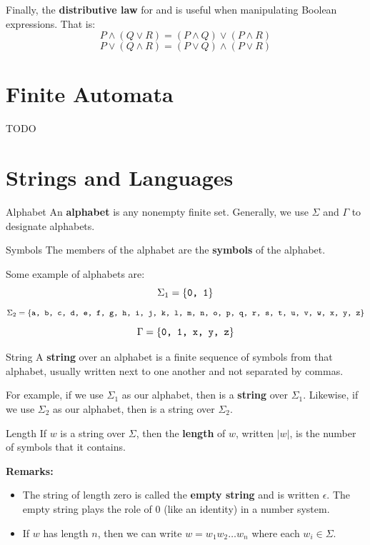 \documentclass[letterpaper]{article}
\begin{document}
Finally, the \textbf{distributive law} for  and  is useful when manipulating Boolean expressions. That is: 
\[P \land (Q \lor R) = (P \land Q) \lor (P \land R)\]
\[P \lor (Q \land R) = (P \lor Q) \land (P \lor R)\]




\newpage 
\section{Finite Automata}
TODO 





\newpage 
\section{Strings and Languages}
\begin{definition}{Alphabet}{}
    An \textbf{alphabet} is any nonempty finite set. Generally, we use $\Sigma$ and $\Gamma$ to designate alphabets.
\end{definition}

\begin{definition}{Symbols}{}
    The members of the alphabet are the \textbf{symbols} of the alphabet.
\end{definition}

Some example of alphabets are: 
\[\Sigma_1 = \{\texttt{0, 1}\}\]
\[\Sigma_2 = \{\texttt{a, b, c, d, e, f, g, h, i, j, k, l, m, n, o, p, q, r, s, t, u, v, w, x, y, z}\}\]
\[\Gamma = \{\texttt{0, 1, x, y, z}\}\]

\begin{definition}{String}{}
    A \textbf{string} over an alphabet is a finite sequence of symbols from that alphabet, usually written next to one another and not separated by commas. 
\end{definition}
For example, if we use $\Sigma_1$ as our alphabet, then  is a \textbf{string} over $\Sigma_1$. Likewise, if we use $\Sigma_2$ as our alphabet, then  is a string over $\Sigma_2$. 

\begin{definition}{Length}{}
    If $w$ is a string over $\Sigma$, then the \textbf{length} of $w$, written $|w|$, is the number of symbols that it contains. 
\end{definition}
\textbf{Remarks:}
\begin{itemize}
    \item The string of length zero is called the \textbf{empty string} and is written $\epsilon$. The empty string plays the role of 0 (like an identity) in a number system.
    \item If $w$ has length $n$, then we can write $w = w_1 w_2 \dots w_n$ where each $w_i \in \Sigma$.
\end{itemize} 
\end{document}

